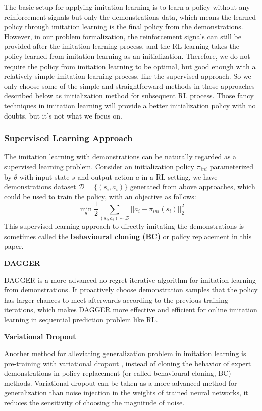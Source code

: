 \documentclass{article}
\begin{document}
The basic setup for applying imitation learning is to learn a policy without any reinforcement signals but only the demonstrations data, which means the learned policy through imitation learning is the final policy from the demonstrations. However, in our problem formalization, the reinforcement signals can still be provided after the imitation learning process, and the RL learning takes the policy learned from imitation learning as an initialization. Therefore, we do not require the policy from imitation learning to be optimal, but good enough with a relatively simple imitation learning process, like the supervised approach. So we only choose some of the simple and straightforward methods in those approaches described below as initialization method for subsequent RL process. Those fancy techniques in imitation learning will provide a better initialization policy with no doubts, but it's not what we focus on.

\subsubsection{Supervised Learning Approach}
The imitation learning with demonstrations can be naturally regarded as a supervised learning problem. Consider an initialization policy $\pi_{ini}$ parameterized by $\theta$ with input state $s$ and output action $a$ in a RL setting, we have demonstrations dataset $\mathcal{D} = \{(s_i, a_i)\}$ generated from above approaches, which could be used to train the policy, with an objective as follows:
\begin{equation}
\label{equ:bc}
    \min_{\theta}\frac{1}{2}\sum_{(s_i, a_i)\sim \mathcal{D}}||a_i- \pi_{ini}(s_i)||^2_2
\end{equation}
This supervised learning approach to directly imitating the demonstrations is sometimes called the \textbf{behavioural cloning (BC)} or policy replacement in this paper.

\textbf{DAGGER}

DAGGER \cite{ross2011reduction} is a more advanced no-regret iterative algorithm for imitation learning from demonstrations. It proactively choose demonstration samples that the policy has larger chances to meet afterwards according to the previous training iterations, which makes DAGGER more effective and efficient for online imitation learning in sequential prediction problem like RL.

\textbf{Variational Dropout}

Another method for alleviating generalization problem in imitation learning is pre-training with variational dropout \cite{blau2018improving}, instead of cloning the behavior of expert demonstrations in policy replacement (or called behavioural cloning, BC) methods. Variational dropout \cite{molchanov2017variational} can be taken as a more advanced method for generalization than noise injection in the weights of trained neural networks, it reduces the sensitivity of choosing the magnitude of noise.
\end{document}
